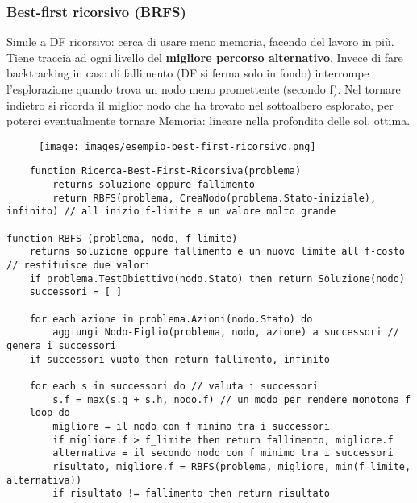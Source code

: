 \subsubsection{Best-first ricorsivo (BRFS)}
Simile a DF ricorsivo: cerca di usare meno memoria, facendo del lavoro in più. Tiene traccia ad ogni livello del \textbf{migliore percorso
alternativo}. Invece di fare backtracking in caso di fallimento (DF si ferma solo in fondo) interrompe l’esplorazione quando
trova un nodo meno promettente (secondo f). Nel tornare indietro si ricorda il miglior nodo che ha
trovato nel sottoalbero esplorato, per poterci eventualmente tornare Memoria: lineare nella profondita delle sol. ottima.
\begin{example}
    \begin{figure}[h!]
        \centering
        \texttt{[image: images/esempio-best-first-ricorsivo.png]}
    \end{figure}
\end{example}
\begin{lstlisting}
    function Ricerca-Best-First-Ricorsiva(problema)
        returns soluzione oppure fallimento
        return RBFS(problema, CreaNodo(problema.Stato-iniziale), infinito) // all inizio f-limite e un valore molto grande

function RBFS (problema, nodo, f-limite)
    returns soluzione oppure fallimento e un nuovo limite all f-costo // restituisce due valori
    if problema.TestObiettivo(nodo.Stato) then return Soluzione(nodo)
    successori = [ ]

    for each azione in problema.Azioni(nodo.Stato) do
        aggiungi Nodo-Figlio(problema, nodo, azione) a successori // genera i successori
    if successori vuoto then return fallimento, infinito

    for each s in successori do // valuta i successori
        s.f = max(s.g + s.h, nodo.f) // un modo per rendere monotona f
    loop do
        migliore = il nodo con f minimo tra i successori
        if migliore.f > f_limite then return fallimento, migliore.f
        alternativa = il secondo nodo con f minimo tra i successori
        risultato, migliore.f = RBFS(problema, migliore, min(f_limite, alternativa))
        if risultato != fallimento then return risultato
\end{lstlisting}

